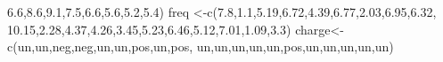 \documentclass[
]{book}
\newenvironment{Shaded}{\begin{snugshade}}{\end{snugshade}}
\newcommand{\FloatTok}[1]{\textcolor[rgb]{0.00,0.00,0.81}{#1}}
\newcommand{\FunctionTok}[1]{\textcolor[rgb]{0.00,0.00,0.00}{#1}}
\newcommand{\NormalTok}[1]{#1}
\newcommand{\OtherTok}[1]{\textcolor[rgb]{0.56,0.35,0.01}{#1}}
\newcommand{\StringTok}[1]{\textcolor[rgb]{0.31,0.60,0.02}{#1}}
\begin{document}
\begin{Shaded}
\begin{Highlighting}[]
                 \FloatTok{6.6}\NormalTok{,}\FloatTok{8.6}\NormalTok{,}\FloatTok{9.1}\NormalTok{,}\FloatTok{7.5}\NormalTok{,}\FloatTok{6.6}\NormalTok{,}\FloatTok{5.6}\NormalTok{,}\FloatTok{5.2}\NormalTok{,}\FloatTok{5.4}\NormalTok{)}
\NormalTok{freq        }\OtherTok{\textless{}{-}}\FunctionTok{c}\NormalTok{(}\FloatTok{7.8}\NormalTok{,}\FloatTok{1.1}\NormalTok{,}\FloatTok{5.19}\NormalTok{,}\FloatTok{6.72}\NormalTok{,}\FloatTok{4.39}\NormalTok{,}\FloatTok{6.77}\NormalTok{,}\FloatTok{2.03}\NormalTok{,}\FloatTok{6.95}\NormalTok{,}\FloatTok{6.32}\NormalTok{,}
                \FloatTok{10.15}\NormalTok{,}\FloatTok{2.28}\NormalTok{,}\FloatTok{4.37}\NormalTok{,}\FloatTok{4.26}\NormalTok{,}\FloatTok{3.45}\NormalTok{,}\FloatTok{5.23}\NormalTok{,}\FloatTok{6.46}\NormalTok{,}\FloatTok{5.12}\NormalTok{,}\FloatTok{7.01}\NormalTok{,}\FloatTok{1.09}\NormalTok{,}\FloatTok{3.3}\NormalTok{)}
\NormalTok{charge}\OtherTok{\textless{}{-}}\FunctionTok{c}\NormalTok{(}\StringTok{\textquotesingle{}un\textquotesingle{}}\NormalTok{,}\StringTok{\textquotesingle{}un\textquotesingle{}}\NormalTok{,}\StringTok{\textquotesingle{}neg\textquotesingle{}}\NormalTok{,}\StringTok{\textquotesingle{}neg\textquotesingle{}}\NormalTok{,}\StringTok{\textquotesingle{}un\textquotesingle{}}\NormalTok{,}\StringTok{\textquotesingle{}un\textquotesingle{}}\NormalTok{,}\StringTok{\textquotesingle{}pos\textquotesingle{}}\NormalTok{,}\StringTok{\textquotesingle{}un\textquotesingle{}}\NormalTok{,}\StringTok{\textquotesingle{}pos\textquotesingle{}}\NormalTok{,}
          \StringTok{\textquotesingle{}un\textquotesingle{}}\NormalTok{,}\StringTok{\textquotesingle{}un\textquotesingle{}}\NormalTok{,}\StringTok{\textquotesingle{}un\textquotesingle{}}\NormalTok{,}\StringTok{\textquotesingle{}un\textquotesingle{}}\NormalTok{,}\StringTok{\textquotesingle{}un\textquotesingle{}}\NormalTok{,}\StringTok{\textquotesingle{}pos\textquotesingle{}}\NormalTok{,}\StringTok{\textquotesingle{}un\textquotesingle{}}\NormalTok{,}\StringTok{\textquotesingle{}un\textquotesingle{}}\NormalTok{,}\StringTok{\textquotesingle{}un\textquotesingle{}}\NormalTok{,}\StringTok{\textquotesingle{}un\textquotesingle{}}\NormalTok{,}\StringTok{\textquotesingle{}un\textquotesingle{}}\NormalTok{)}

\end{Highlighting}
\end{Shaded}
\end{document}
